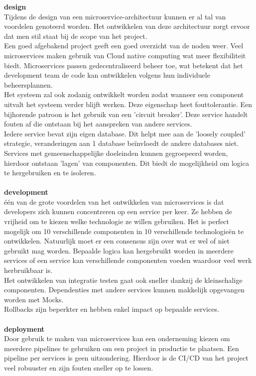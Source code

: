 \textbf{design}\\ 
Tijdens de design van een microservice-architectuur kunnen er al tal van voordelen genoteerd worden. Het ontwikkelen van deze architectuur zorgt ervoor dat men stil staat bij de scope van het project.\\ 
Een goed afgebakend project geeft een goed overzicht van de noden weer. Veel microservices maken gebruik van Cloud native computing wat meer flexibiliteit biedt. Microservices passen gedecentraliseerd beheer toe, wat betekent dat het development team de code kan ontwikkelen volgens hun individuele beheersplannen.\\ 
Het systeem zal ook zodanig ontwikkelt worden zodat wanneer een component uitvalt het systeem verder blijft werken. Deze eigenschap heet fouttolerantie. Een bijhorende patroon is het gebruik van een 'circuit breaker'. Deze service handelt fouten af die ontstaan bij het aanspreken van andere services.\\
Iedere service bevat zijn eigen database. Dit helpt mee aan de 'loosely coupled' strategie, veranderingen aan 1 database beïnvloedt de andere databases niet.\\
Services met gemeenschappelijke doeleinden kunnen gegroepeerd worden, hierdoor ontstaan 'lagen' van
componenten. Dit biedt de mogelijkheid om logica te hergebruiken en te isoleren.\\ \\
\textbf{development}\\ één van de grote voordelen van het ontwikkelen van microservices is dat developers zich kunnen concentreren op een service per keer. Ze hebben de vrijheid om te kiezen welke technologie ze willen gebruiken. Het is perfect mogelijk om 10 verschillende componenten in 10 verschillende technologieën te ontwikkelen. Natuurlijk moet er een consensus zijn over wat er wel of niet gebruikt mag worden. Bepaalde logica kan hergebruikt worden in meerdere services of een service kan verschillende componenten voeden waardoor veel werk herbruikbaar is. \\
Het ontwikkelen van integratie testen gaat ook sneller dankzij de kleinschalige componenten. Dependenties met andere services kunnen makkelijk opgevangen worden met Mocks.\\
Rollbacks zijn beperkter en hebben enkel impact op bepaalde services.\\ \\
\textbf{deployment}\\ Door gebruik te maken van microservices kan een onderneming kiezen om meerdere pipelines te gebruiken om een project in productie te plaatsen. Een pipeline per services is geen uitzondering. Hierdoor is de CI/CD van het project veel robuuster en zijn fouten sneller op te lossen.

